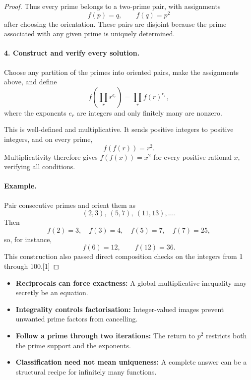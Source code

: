 \begin{dlsummary}[title={\bfseries Solution 49. The Prime-Pairing Machine},breakable]
\begin{proof}
Thus every prime belongs to a two-prime pair, with assignments
\[
f(p)=q,\qquad f(q)=p^2
\]
after choosing the orientation. These pairs are disjoint because the prime associated with any given prime is uniquely determined.

\paragraph{4. Construct and verify every solution.}

Choose any partition of the primes into oriented pairs, make the assignments above, and define
\[
f\!\left(\prod_r r^{e_r}\right)=\prod_r f(r)^{e_r},
\]
where the exponents \(e_r\) are integers and only finitely many are nonzero.

This is well-defined and multiplicative. It sends positive integers to positive integers, and on every prime,
\[
f(f(r))=r^2.
\]
Multiplicativity therefore gives \(f(f(x))=x^2\) for every positive rational \(x\), verifying all conditions.

\paragraph{Example.}

Pair consecutive primes and orient them as
\[
(2,3),\ (5,7),\ (11,13),\ldots.
\]
Then
\[
f(2)=3,\quad f(3)=4,\quad f(5)=7,\quad f(7)=25,
\]
so, for instance,
\[
f(6)=12,\qquad f(12)=36.
\]
This construction also passed direct composition checks on the integers from 1 through 100.[1]
\end{proof}
\end{dlsummary}

\begin{takeaways}
\begin{itemize}
\item \textbf{Reciprocals can force exactness:} A global multiplicative inequality may secretly be an equation.
\item \textbf{Integrality controls factorisation:} Integer-valued images prevent unwanted prime factors from cancelling.
\item \textbf{Follow a prime through two iterations:} The return to \(p^2\) restricts both the prime support and the exponents.
\item \textbf{Classification need not mean uniqueness:} A complete answer can be a structural recipe for infinitely many functions.
\end{itemize}
\end{takeaways}
